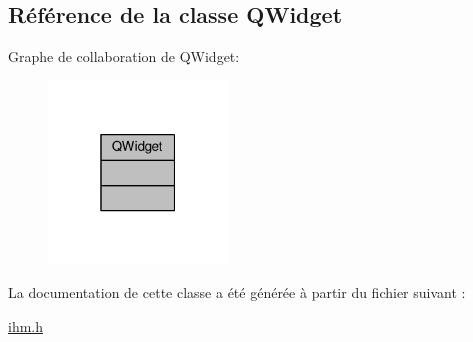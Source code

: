\hypertarget{class_q_widget}{}\subsection{Référence de la classe Q\+Widget}
\label{class_q_widget}


Graphe de collaboration de Q\+Widget\+:\nopagebreak
\begin{figure}[H]
\begin{center}
\leavevmode
\includegraphics[width=135pt]{class_q_widget__coll__graph}
\end{center}
\end{figure}


La documentation de cette classe a été générée à partir du fichier suivant \+:\begin{DoxyCompactItemize}
\item 
\hyperlink{ihm_8h}{ihm.\+h}\end{DoxyCompactItemize}
